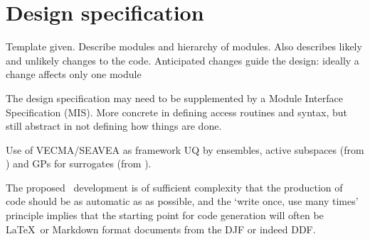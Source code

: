 
\section{Design specification}\label{sec:DDF_spec}
Template given. Describe modules and hierarchy of modules. Also describes likely and unlikely changes to the code.
Anticipated changes guide the design: ideally a change affects only one module


The design specification may need to be supplemented by a Module Interface Specification (MIS).
More concrete in defining access routines and syntax, but still abstract in not defining how
things are done.

Use of VECMA/SEAVEA as framework
UQ by ensembles,  active subspaces (from \cite{y3re242}) and GPs for surrogates (from \cite{y3re252}).

The proposed \nep\ development is of sufficient complexity that the production
of code should be as automatic as as possible, and the `write once, use many times'
principle implies that the starting point for code generation will often be \LaTeX \ or Markdown format
documents from the DJF or indeed DDF.

